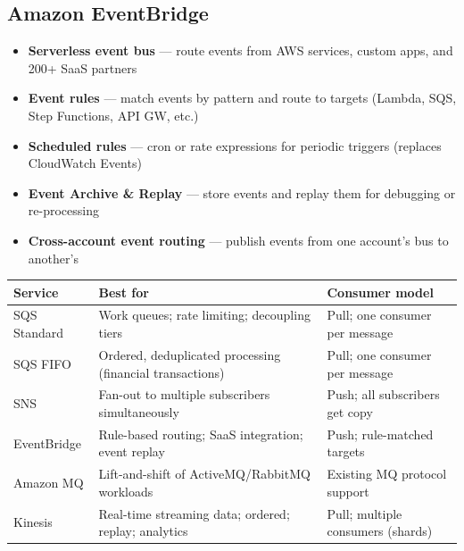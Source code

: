 \subsection{Amazon EventBridge}

\begin{keyfacts}
\begin{itemize}
  \item \textbf{Serverless event bus} --- route events from AWS services, custom apps, and 200+ SaaS partners
  \item \textbf{Event rules} --- match events by pattern and route to targets (Lambda, SQS, Step Functions, API GW, etc.)
  \item \textbf{Scheduled rules} --- cron or rate expressions for periodic triggers (replaces CloudWatch Events)
  \item \textbf{Event Archive \& Replay} --- store events and replay them for debugging or re-processing
  \item \textbf{Cross-account event routing} --- publish events from one account's bus to another's
\end{itemize}
\end{keyfacts}

\begin{comparebox}[title={SQS vs SNS vs EventBridge --- when to use each}]
\begin{tabular}{@{}p{3.5cm}p{4.5cm}p{4cm}@{}}
\toprule
\textbf{Service} & \textbf{Best for} & \textbf{Consumer model} \\
\midrule
SQS Standard      & Work queues; rate limiting; decoupling tiers                 & Pull; one consumer per message \\
SQS FIFO          & Ordered, deduplicated processing (financial transactions)     & Pull; one consumer per message \\
SNS               & Fan-out to multiple subscribers simultaneously               & Push; all subscribers get copy \\
EventBridge       & Rule-based routing; SaaS integration; event replay            & Push; rule-matched targets \\
Amazon MQ         & Lift-and-shift of ActiveMQ/RabbitMQ workloads                & Existing MQ protocol support \\
Kinesis           & Real-time streaming data; ordered; replay; analytics          & Pull; multiple consumers (shards) \\
\bottomrule
\end{tabular}
\end{comparebox}

